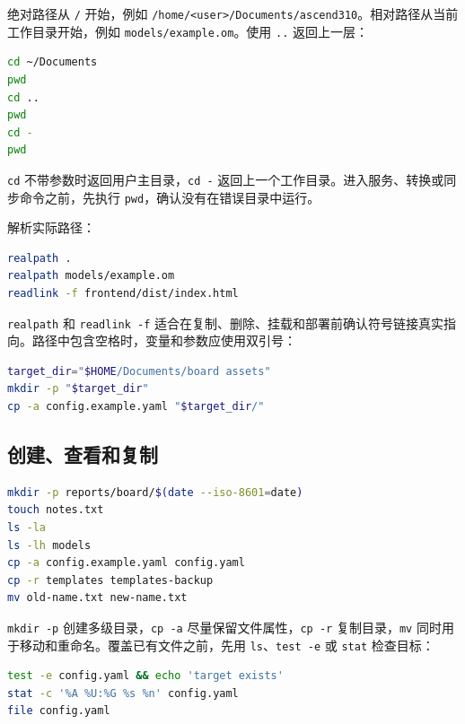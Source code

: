 绝对路径从 \passthrough{\lstinline!/!} 开始，例如
\passthrough{\lstinline!/home/<user>/Documents/ascend310!}。相对路径从当前工作目录开始，例如
\passthrough{\lstinline!models/example.om!}。使用
\passthrough{\lstinline!..!} 返回上一层：

\begin{lstlisting}[language=bash]
cd ~/Documents
pwd
cd ..
pwd
cd -
pwd
\end{lstlisting}

\passthrough{\lstinline!cd!}
不带参数时返回用户主目录，\passthrough{\lstinline!cd -!}
返回上一个工作目录。进入服务、转换或同步命令之前，先执行
\passthrough{\lstinline!pwd!}，确认没有在错误目录中运行。

解析实际路径：

\begin{lstlisting}[language=bash]
realpath .
realpath models/example.om
readlink -f frontend/dist/index.html
\end{lstlisting}

\passthrough{\lstinline!realpath!} 和
\passthrough{\lstinline!readlink -f!}
适合在复制、删除、挂载和部署前确认符号链接真实指向。路径中包含空格时，变量和参数应使用双引号：

\begin{lstlisting}[language=bash]
target_dir="$HOME/Documents/board assets"
mkdir -p "$target_dir"
cp -a config.example.yaml "$target_dir/"
\end{lstlisting}

\subsection{创建、查看和复制}\label{ux521bux5efaux67e5ux770bux548cux590dux5236}

\begin{lstlisting}[language=bash]
mkdir -p reports/board/$(date --iso-8601=date)
touch notes.txt
ls -la
ls -lh models
cp -a config.example.yaml config.yaml
cp -r templates templates-backup
mv old-name.txt new-name.txt
\end{lstlisting}

\passthrough{\lstinline!mkdir -p!}
创建多级目录，\passthrough{\lstinline!cp -a!}
尽量保留文件属性，\passthrough{\lstinline!cp -r!}
复制目录，\passthrough{\lstinline!mv!}
同时用于移动和重命名。覆盖已有文件之前，先用
\passthrough{\lstinline!ls!}、\passthrough{\lstinline!test -e!} 或
\passthrough{\lstinline!stat!} 检查目标：

\begin{lstlisting}[language=bash]
test -e config.yaml && echo 'target exists'
stat -c '%A %U:%G %s %n' config.yaml
file config.yaml
\end{lstlisting}

